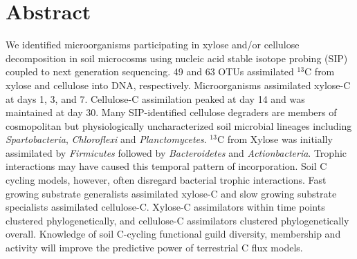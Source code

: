 \section{Abstract} We identified microorganisms participating in xylose and/or
cellulose decomposition in soil microcosms using nucleic acid stable isotope
probing (SIP) coupled to next generation sequencing. 49 and 63
OTUs assimilated $^{13}$C from xylose and cellulose into DNA, respectively.
Microorganisms assimilated xylose-C at days 1, 3, and 7. Cellulose-C
assimilation peaked at day 14 and was maintained at day 30. Many SIP-identified
cellulose degraders are members of cosmopolitan but physiologically
uncharacterized soil microbial lineages including \textit{Spartobacteria},
\textit{Chloroflexi} and \textit{Planctomycetes}. $^{13}$C from Xylose was
initially assimilated by \textit{Firmicutes} followed by \textit{Bacteroidetes}
and \textit{Actionbacteria}. Trophic interactions may have caused this temporal
pattern of incorporation. Soil C cycling models, however, often disregard
bacterial trophic interactions. Fast growing substrate generalists assimilated
xylose-C and slow growing substrate specialists assimilated cellulose-C.
Xylose-C assimilators within time points clustered phylogenetically, and
cellulose-C assimilators clustered phylogenetically overall. Knowledge of soil
C-cycling functional guild diversity, membership and activity will improve the
predictive power of terrestrial C flux models. 
